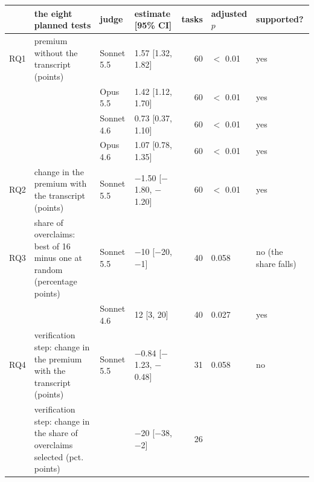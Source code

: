 {\scriptsize\setlength{\tabcolsep}{3.2pt}\renewcommand{\arraystretch}{0.95}
\begin{tabular}{@{}l>{\raggedright\arraybackslash}p{5.9cm}llrll@{}}
\toprule
 & the eight planned tests & judge & estimate [95\% CI] & tasks & adjusted $p$ & supported? \\
\midrule
RQ1 & premium without the transcript (points) & Sonnet 5.5 & 1.57 [1.32, 1.82] & 60 & $<$ 0.01 & yes \\
 &  & Opus 5.5 & 1.42 [1.12, 1.70] & 60 & $<$ 0.01 & yes \\
 &  & Sonnet 4.6 & 0.73 [0.37, 1.10] & 60 & $<$ 0.01 & yes \\
 &  & Opus 4.6 & 1.07 [0.78, 1.35] & 60 & $<$ 0.01 & yes \\
RQ2 & change in the premium with the transcript (points) & Sonnet 5.5 & $-$1.50 [$-$1.80, $-$1.20] & 60 & $<$ 0.01 & yes \\
RQ3 & share of overclaims: best of 16 minus one at random (percentage points) & Sonnet 5.5 & $-$10 [$-$20, $-$1] & 40 & 0.058 & no (the share falls) \\
 &  & Sonnet 4.6 & 12 [3, 20] & 40 & 0.027 & yes \\
RQ4 & verification step: change in the premium with the transcript (points) & Sonnet 5.5 & $-$0.84 [$-$1.23, $-$0.48] & 31 & 0.058 & no \\
 & verification step: change in the share of overclaims selected (pct. points) &  & $-$20 [$-$38, $-$2] & 26 &  &  \\
\bottomrule
\end{tabular}}
